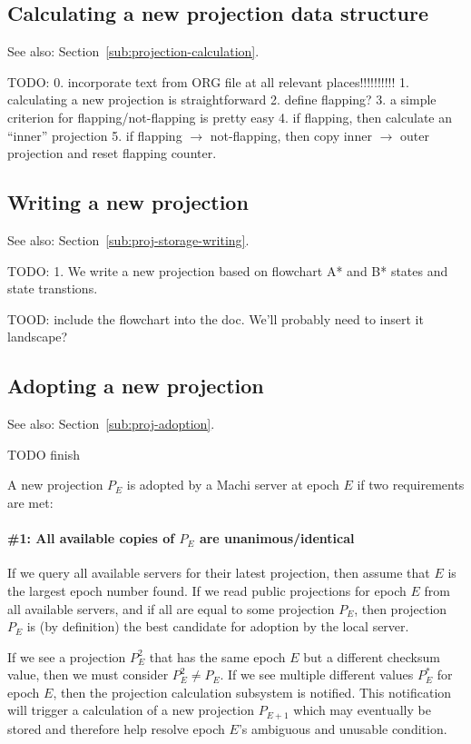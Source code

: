 \documentclass[preprint,10pt]{sigplanconf}
\begin{document}
\subsection{Calculating a new projection data structure}

See also: Section~\ref{sub:projection-calculation}.

TODO:
0. incorporate text from ORG file at all relevant places!!!!!!!!!!
1. calculating a new projection is straightforward
2. define flapping?
3. a simple criterion for flapping/not-flapping is pretty easy
4. if flapping, then calculate an ``inner'' projection
5. if flapping $\rightarrow$ not-flapping, then copy inner
$\rightarrow$ outer projection and reset flapping counter.

\subsection{Writing a new projection}

See also: Section~\ref{sub:proj-storage-writing}.

TODO:
1. We write a new projection based on flowchart A* and B* states and
state transtions.

TOOD: include the flowchart into the doc.  We'll probably need to
insert it landscape?

\subsection{Adopting a new projection}

See also: Section~\ref{sub:proj-adoption}.

TODO finish

A new projection $P_E$ is adopted by a Machi server at epoch $E$ if
two requirements are met:

\paragraph{\#1: All available copies of $P_E$ are unanimous/identical}

If we query all available servers for their latest projection, then assume
that $E$ is the largest epoch number found.  If we read public
projections for epoch $E$ from all available servers, and if all are
equal to some projection $P_E$, then projection $P_E$ is
(by definition) the best candidate for adoption by the local server.

If we see a projection $P^2_E$ that has the same epoch $E$ but a
different checksum value, then we must consider $P^2_E \ne P_E$.
If we see multiple different values $P^*_E$ for epoch $E$, then the
projection calculation subsystem is notified.  This notification
will trigger a calculation of a new projection $P_{E+1}$ which
may eventually be stored and therefore help
resolve epoch $E$'s ambiguous and unusable condition.
\end{document}
